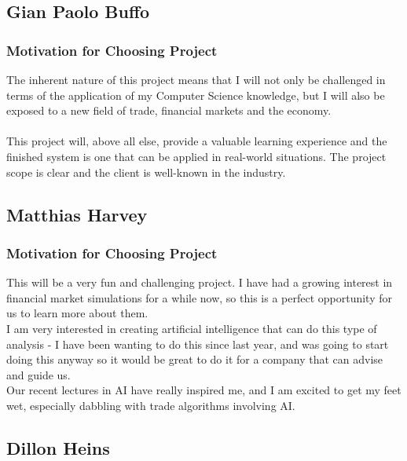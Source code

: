 \documentclass{article}
\begin{document}
	\cleardoublepage		
		
	\subsection{Gian Paolo Buffo}
		
		\subsubsection{Motivation for Choosing Project}
		The inherent nature of this project means that I will not only be challenged in terms of the application of my Computer Science knowledge, but I will also be exposed to a new field of trade, financial markets and the economy.
\\\\
This project will, above all else, provide a valuable learning experience and the finished system is one that can be applied in real-world situations. The project scope is clear and the client is well-known in the industry. 

	\cleardoublepage

	\subsection{Matthias Harvey}
		
		\subsubsection{Motivation for Choosing Project}
		This will be a very fun and challenging project. I have had a growing interest in financial market simulations for a while now, so this is a perfect opportunity for us to learn more about them.\\
		
		I am very interested in creating artificial intelligence that can do this type of analysis - I have been wanting to do this since last year, and was going to start doing this anyway so it would be great to do it for a company that can advise and guide us.\\

		Our recent lectures in AI have really inspired me, and I am excited to get my feet wet, especially dabbling with trade algorithms involving AI.
	\cleardoublepage
	
	\subsection{Dillon Heins}
		
\end{document}
